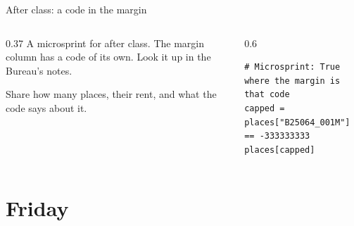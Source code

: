 \documentclass[9pt,aspectratio=169]{beamer}
\begin{document}
\begin{frame}[fragile]{After class: a code in the margin}
    \begin{columns}[T]
        \begin{column}{0.37\textwidth}
            A microsprint for after class. The margin column has a code of its own. Look it up in the Bureau's notes.

            \medskip
            Share how many places, their rent, and what the code says about it.
        \end{column}
        \begin{column}{0.6\textwidth}
\begin{lstlisting}
# Microsprint: True where the margin is that code
capped = places["B25064_001M"] == -333333333
places[capped]
\end{lstlisting}
        \end{column}
    \end{columns}
\end{frame}

\section{Friday}
\end{document}
